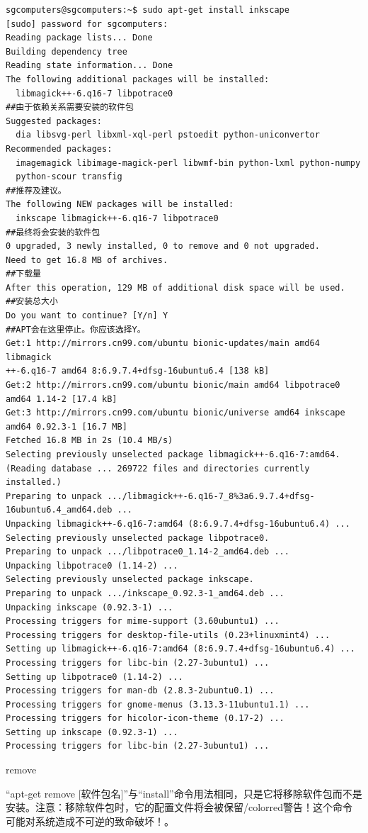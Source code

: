\documentclass{book}
\begin{document}
\begin{verbatim}
sgcomputers@sgcomputers:~$ sudo apt-get install inkscape
[sudo] password for sgcomputers: 
Reading package lists... Done
Building dependency tree       
Reading state information... Done
The following additional packages will be installed:
  libmagick++-6.q16-7 libpotrace0
##由于依赖关系需要安装的软件包
Suggested packages:
  dia libsvg-perl libxml-xql-perl pstoedit python-uniconvertor
Recommended packages:
  imagemagick libimage-magick-perl libwmf-bin python-lxml python-numpy
  python-scour transfig
##推荐及建议。
The following NEW packages will be installed:
  inkscape libmagick++-6.q16-7 libpotrace0
##最终将会安装的软件包
0 upgraded, 3 newly installed, 0 to remove and 0 not upgraded.
Need to get 16.8 MB of archives.
##下载量
After this operation, 129 MB of additional disk space will be used.
##安装总大小
Do you want to continue? [Y/n] Y
##APT会在这里停止。你应该选择Y。
Get:1 http://mirrors.cn99.com/ubuntu bionic-updates/main amd64 libmagick
++-6.q16-7 amd64 8:6.9.7.4+dfsg-16ubuntu6.4 [138 kB]
Get:2 http://mirrors.cn99.com/ubuntu bionic/main amd64 libpotrace0 amd64 1.14-2 [17.4 kB]
Get:3 http://mirrors.cn99.com/ubuntu bionic/universe amd64 inkscape amd64 0.92.3-1 [16.7 MB]
Fetched 16.8 MB in 2s (10.4 MB/s)    
Selecting previously unselected package libmagick++-6.q16-7:amd64.
(Reading database ... 269722 files and directories currently installed.)
Preparing to unpack .../libmagick++-6.q16-7_8%3a6.9.7.4+dfsg-16ubuntu6.4_amd64.deb ...
Unpacking libmagick++-6.q16-7:amd64 (8:6.9.7.4+dfsg-16ubuntu6.4) ...
Selecting previously unselected package libpotrace0.
Preparing to unpack .../libpotrace0_1.14-2_amd64.deb ...
Unpacking libpotrace0 (1.14-2) ...
Selecting previously unselected package inkscape.
Preparing to unpack .../inkscape_0.92.3-1_amd64.deb ...
Unpacking inkscape (0.92.3-1) ...
Processing triggers for mime-support (3.60ubuntu1) ...
Processing triggers for desktop-file-utils (0.23+linuxmint4) ...
Setting up libmagick++-6.q16-7:amd64 (8:6.9.7.4+dfsg-16ubuntu6.4) ...
Processing triggers for libc-bin (2.27-3ubuntu1) ...
Setting up libpotrace0 (1.14-2) ...
Processing triggers for man-db (2.8.3-2ubuntu0.1) ...
Processing triggers for gnome-menus (3.13.3-11ubuntu1.1) ...
Processing triggers for hicolor-icon-theme (0.17-2) ...
Setting up inkscape (0.92.3-1) ...
Processing triggers for libc-bin (2.27-3ubuntu1) ...
\end{verbatim}
\begin{center} remove \end{center}
“apt-get remove [软件包名]”与“install”命令用法相同，只是它将移除软件包而不是安装。注意：移除软件包时，它的配置文件将会被保留{/color{red}{警告！这个命令可能对系统造成不可逆的致命破坏！}}。\par
\end{document}
